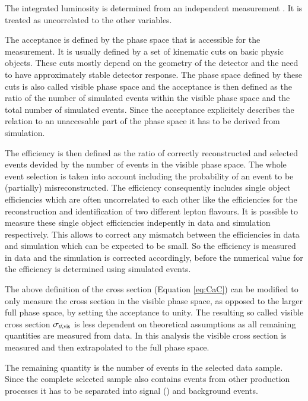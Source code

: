 The integrated luminosity is determined from an independent measurement \cite{CMS-PAS-LUM-17-001}. It is treated as uncorrelated to the other variables.

The acceptance is defined by the phase space that is accessible for the measurement. It is usually defined by a set of kinematic cuts on basic physic objects. These cuts mostly depend on the geometry of the detector and the need to have approximately stable detector response.
The phase space defined by these cuts is also called visible phase space and the acceptance is then defined as the ratio of the number of simulated \ttbar events within the visible phase space and the total number of simulated \ttbar events. Since the acceptance explicitely describes the relation to an unaccesable part of the phase space it has to be derived from simulation.

The efficiency is then defined as the ratio of correctly reconstructed and selected \ttbar events devided by the number of \ttbar events in the visible phase space. The whole event selection is taken into account including the probability of an event to be (partially) misreconstructed. The efficiency consequently includes single object efficiencies which are often uncorrelated to each other like the
efficiencies for the reconstruction and identification of two different lepton flavours. It is possible to measure these single object efficiencies indepently in data and simulation respectively.
This allows to correct any mismatch between the efficiencies in data and simulation which can be expected to be small. So the efficiency is measured in data and the simulation is corrected accordingly, 
before the numerical value for the efficiency is determined using simulated events.

The above definition of the cross section (Equation \ref{eq:CaC}) can be modified to only measure the cross section in the visible phase space, as opposed to the larger full phase space, by setting the 
acceptance to unity. The resulting so called visible cross section $\sigma_{t\bar{t},\mathrm{vis}}$ is less dependent on theoretical assumptions as all remaining quantities are measured from data.
In this analysis the visible cross section is measured and then extrapolated to the full phase space.

The remaining quantity is the number of \ttbar events in the selected data sample. Since the complete selected sample also contains events from other production processes it has to be separated into
signal (\ttbar) and background events. 

